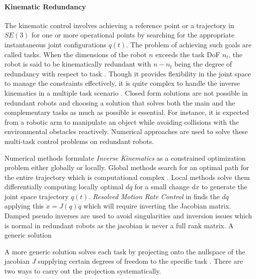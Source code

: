 \paragraph{Kinematic Redundancy}
The kinematic control involves achieving a reference point or a trajectory in $SE(3)$ for one or more operational points by searching for the appropriate instantaneous joint configurations  $q(t)$. The problem of achieving such goals are called tasks. When the dimensions of the robot $n$ exceeds the task DoF $n_t$, the robot is said to be kinematically redundant with $n − n_t$ being the degree of redundancy with respect to task \cite{nakamura1990advanced}. Though it provides flexibility in the joint space to manage the constraints effectively, it is quite complex to handle the inverse kinematics in a multiple task scenario \cite{siciliano1991general}. Closed form solutions are not possible in redundant robots and choosing a solution that solves both the main and the complementary tasks as much as possible is essential. For instance, it is expected from a robotic arm to manipulate an object while avoiding collisions with the environmental obstacles reactively. Numerical approaches are used to solve these multi-task control problems on redundant robots.

Numerical methods formulate \textit{Inverse Kinematics} as a constrained optimization problem either globally or locally. Global methods search for an optimal path for the entire trajectory which is computational complex \cite{baillieul1990resolution}. Local methods solve them differentially computing locally optimal $dq$ for a small change $dx$ to generate the joint space trajectory $q(t)$. \textit{Resolved Motion Rate Control} in \cite{Whitney1969} finds the $dq$ applying this $\dot{x} = J(q) \dot{q}$ which will require inverting the Jacobian matrix. Damped pseudo inverses \cite{nakamura1986inverse} are used to avoid singularities and inversion issues which is normal in redundant robots as the jacobian is never a full rank matrix. A generic solution 

 A more generic solution solves each task by projecting onto the nullspace of the jacobian $J$ supplying certain degrees of freedom to the specific task \cite{Liegeois1977}. There are two ways to carry out the projection systematically.

